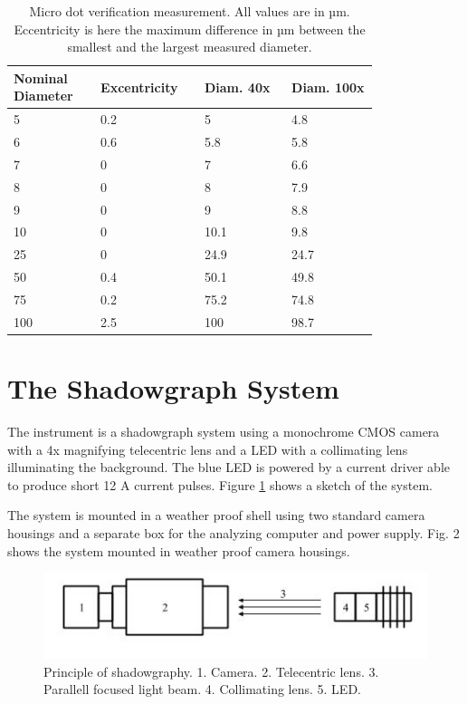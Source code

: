 \begin{table}[ht]
\centering
\begin{tabular}{p{0.2\linewidth} p{0.2\linewidth} p{0.2\linewidth} p{0.2\linewidth}}
\hline
\textbf{Nominal Diameter} & \textbf{Excentricity} & \textbf{Diam. 40x} & \textbf{Diam. 100x} \\
\hline
5 & 0.2 & 5 & 4.8 \\
6 & 0.6 & 5.8 & 5.8 \\
7 & 0 & 7 & 6.6 \\
8 & 0 & 8 & 7.9 \\
9 & 0 & 9 & 8.8 \\
10 & 0 & 10.1 & 9.8 \\
25 & 0 & 24.9 & 24.7 \\
50 & 0.4 & 50.1 & 49.8 \\
75 & 0.2 & 75.2 & 74.8 \\
100 & 2.5 & 100 & 98.7 \\
\hline
\end{tabular}
\caption{Micro dot verification measurement. All values are in µm. Eccentricity is here the maximum difference in µm between the smallest and the largest measured diameter.}
\label{tab:ref_meas}
\end{table}


\section{The Shadowgraph System}

The instrument is a shadowgraph system using a monochrome CMOS camera with a 4x magnifying telecentric lens and a LED with a collimating lens illuminating the background. The blue LED is powered by a current driver able to produce short 12 A current pulses. Figure \cref{fig:shadowprinc} shows a sketch of the system. 

The system is mounted in a weather proof shell using two standard camera housings and a separate box for the analyzing computer and power supply. Fig. 2 shows the system mounted in weather proof camera housings. 

\begin{figure}[ht]
\centering\includegraphics[width=0.75\linewidth]{./figures/shadowprinc.jpg}
\caption{Principle of shadowgraphy. 1. Camera. 2. Telecentric lens. 3. Parallell focused light beam. 4. Collimating lens. 5. LED.}
\label{fig:shadowprinc}
\end{figure}

